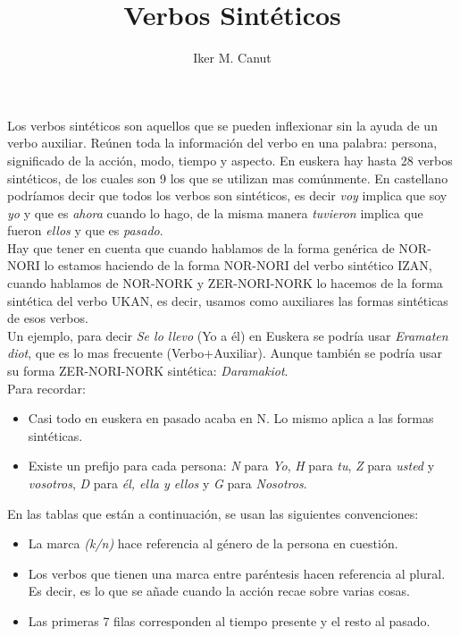 \documentclass[11pt, a4paper]{article}
\begin{document}
\author{Iker M. Canut}
\date{}
\title{Verbos Sintéticos\\}
\maketitle

Los verbos sintéticos son aquellos que se pueden inflexionar sin la ayuda de un verbo auxiliar. Reúnen toda la información del verbo en una palabra: persona, significado de la acción, modo, tiempo y aspecto. En euskera hay hasta 28 verbos sintéticos, de los cuales son 9 los que se utilizan mas comúnmente. En castellano podríamos decir que todos los verbos son sintéticos, es decir \textit{voy} implica que soy \textit{yo} y que es \textit{ahora} cuando lo hago, de la misma manera \textit{tuvieron} implica que fueron \textit{ellos} y que es \textit{pasado}.\\

Hay que tener en cuenta que cuando hablamos de la forma genérica de NOR-NORI lo estamos haciendo de la forma NOR-NORI del verbo sintético IZAN, cuando hablamos de NOR-NORK y ZER-NORI-NORK lo hacemos de la forma sintética del verbo UKAN, es decir, usamos como auxiliares las formas sintéticas de esos verbos.\\

Un ejemplo, para decir \textit{Se lo llevo} (Yo a él) en Euskera se podría usar \textit{Eramaten diot}, que es lo mas frecuente (Verbo+Auxiliar). Aunque también se podría usar su forma ZER-NORI-NORK sintética: \textit{Daramakiot}.\\

Para recordar:
\begin{itemize}
\item Casi todo en euskera en pasado acaba en N. Lo mismo aplica a las formas sintéticas.
\item Existe un prefijo para cada persona: \textit{N} para \textit{Yo}, \textit{H} para \textit{tu}, \textit{Z} para \textit{usted} y \textit{vosotros}, \textit{D} para \textit{él, ella y ellos} y \textit{G} para \textit{Nosotros}.\\
\end{itemize}

En las tablas que están a continuación, se usan las siguientes convenciones:
\begin{itemize}
	\item La marca \textit{(k/n)} hace referencia al género de la persona en cuestión.
	\item Los verbos que tienen una marca entre paréntesis hacen referencia al plural. Es decir, es lo que se añade cuando la acción recae sobre varias cosas.
	\item Las primeras 7 filas corresponden al tiempo presente y el resto al pasado.
\end{itemize}
\end{document}
